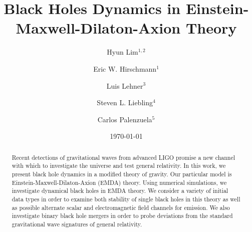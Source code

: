 \documentclass[%
 reprint,
 amsmath,amssymb,
 aps,
]{revtex4-1}
\begin{document}

\title{Black Holes Dynamics in Einstein-Maxwell-Dilaton-Axion Theory}%

\author{Hyun Lim$^{1,2}$}
\author{Eric W. Hirschmann$^1$}%
\author{Luis Lehner$^3$}
\author{Steven L. Liebling$^4$}
\author{Carlos Palenzuela$^5$}
%

\date{\today}%

\begin{abstract}
Recent detections of gravitational waves from advanced LIGO promise a new channel with which to investigate the universe and test general relativity. In this work, we present black hole dynamics in a modified theory of gravity. Our particular model is Einstein-Maxwell-Dilaton-Axion (EMDA) theory. Using numerical simulations, we investigate dynamical black holes in EMDA theory. We consider a variety of initial data types in order to examine both stability of single black holes in this theory as well as possible alternate scalar and electromagnetic field channels for emission. We also investigate binary black hole mergers in order to probe deviations from the standard gravitational wave signatures of general relativity.
\end{abstract}

\maketitle
\end{document}
